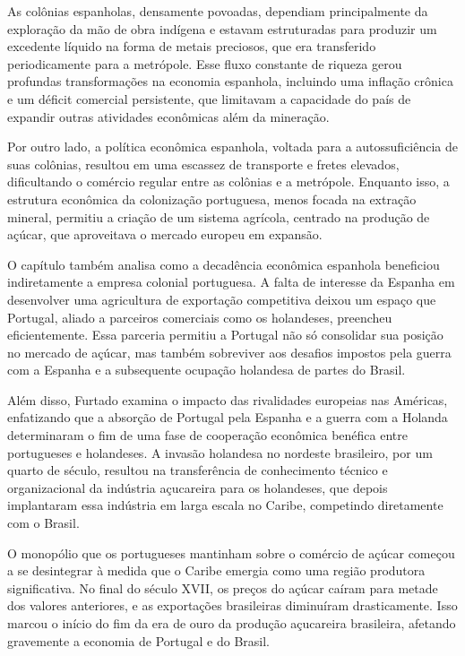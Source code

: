 \documentclass[a4paper,12pt]{article}[abntex2]
\begin{document}
As colônias espanholas, densamente povoadas, dependiam principalmente da exploração da mão de obra indígena e estavam estruturadas para produzir um excedente líquido na forma de metais preciosos, que era transferido periodicamente para a metrópole. Esse fluxo constante de riqueza gerou profundas transformações na economia espanhola, incluindo uma inflação crônica e um déficit comercial persistente, que limitavam a capacidade do país de expandir outras atividades econômicas além da mineração.

Por outro lado, a política econômica espanhola, voltada para a autossuficiência de suas colônias, resultou em uma escassez de transporte e fretes elevados, dificultando o comércio regular entre as colônias e a metrópole. Enquanto isso, a estrutura econômica da colonização portuguesa, menos focada na extração mineral, permitiu a criação de um sistema agrícola, centrado na produção de açúcar, que aproveitava o mercado europeu em expansão.

O capítulo também analisa como a decadência econômica espanhola beneficiou indiretamente a empresa colonial portuguesa. A falta de interesse da Espanha em desenvolver uma agricultura de exportação competitiva deixou um espaço que Portugal, aliado a parceiros comerciais como os holandeses, preencheu eficientemente. Essa parceria permitiu a Portugal não só consolidar sua posição no mercado de açúcar, mas também sobreviver aos desafios impostos pela guerra com a Espanha e a subsequente ocupação holandesa de partes do Brasil.

Além disso, Furtado examina o impacto das rivalidades europeias nas Américas, enfatizando que a absorção de Portugal pela Espanha e a guerra com a Holanda determinaram o fim de uma fase de cooperação econômica benéfica entre portugueses e holandeses. A invasão holandesa no nordeste brasileiro, por um quarto de século, resultou na transferência de conhecimento técnico e organizacional da indústria açucareira para os holandeses, que depois implantaram essa indústria em larga escala no Caribe, competindo diretamente com o Brasil.

O monopólio que os portugueses mantinham sobre o comércio de açúcar começou a se desintegrar à medida que o Caribe emergia como uma região produtora significativa. No final do século XVII, os preços do açúcar caíram para metade dos valores anteriores, e as exportações brasileiras diminuíram drasticamente. Isso marcou o início do fim da era de ouro da produção açucareira brasileira, afetando gravemente a economia de Portugal e do Brasil.
\end{document}
